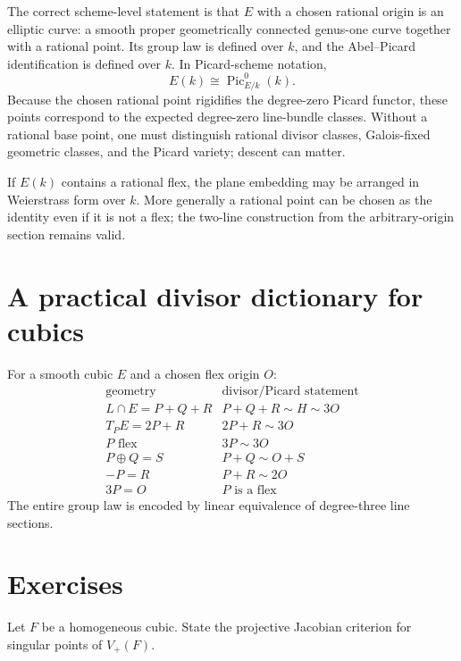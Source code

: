 The correct scheme-level statement is that \(E\) with a chosen rational origin is an elliptic curve: a smooth proper geometrically connected genus-one curve together with a rational point.  Its group law is defined over \(k\), and the Abel--Picard identification is defined over \(k\).  In Picard-scheme notation,
\[
  E(k)\cong \operatorname{Pic}^0_{E/k}(k).
\]
Because the chosen rational point rigidifies the degree-zero Picard functor, these points correspond to the expected degree-zero line-bundle classes.  Without a rational base point, one must distinguish rational divisor classes, Galois-fixed geometric classes, and the Picard variety; descent can matter.

If \(E(k)\) contains a rational flex, the plane embedding may be arranged in Weierstrass form over \(k\).  More generally a rational point can be chosen as the identity even if it is not a flex; the two-line construction from the arbitrary-origin section remains valid.

\section{A practical divisor dictionary for cubics}

For a smooth cubic \(E\) and a chosen flex origin \(O\):
\[
\begin{array}{c|c}
\text{geometry} & \text{divisor/Picard statement}\\
\hline
L\cap E=P+Q+R & P+Q+R\sim H\sim3O\\
T_PE=2P+R & 2P+R\sim3O\\
P\text{ flex} & 3P\sim3O\\
P\oplus Q=S & P+Q\sim O+S\\
-P=R & P+R\sim2O\\
3P=O & P\text{ is a flex}
\end{array}
\]
The entire group law is encoded by linear equivalence of degree-three line sections.



\section{Exercises}

\begin{exercise}\label{exr:vi43-01}
Let \(F\) be a homogeneous cubic.  State the projective Jacobian criterion for singular points of \(V_+(F)\).
\end{exercise}

